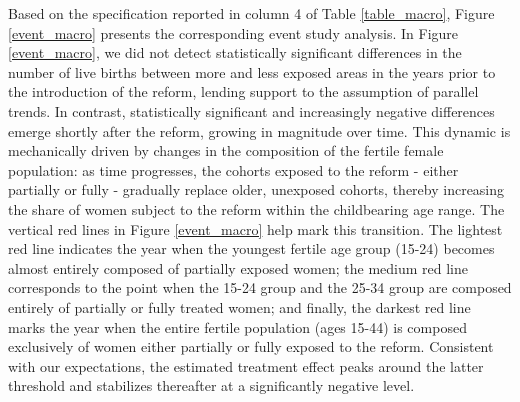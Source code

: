 \documentclass[a4paper,oneside,final,onecolumn,12pt,english]{article}
\begin{document}
\begin{table}[htp!]
\caption{The impact of Francoist primary school reform on the number of births: DiD}
\label{table_macro}
	\center
\end{table}


Based on the specification reported in column 4 of Table \ref{table_macro}, Figure \ref{event_macro} presents the corresponding event study analysis. In Figure \ref{event_macro}, we did not detect statistically significant differences in the number of live births between more and less exposed areas in the years prior to the introduction of the reform, lending support to the assumption of parallel trends. In contrast, statistically significant and increasingly negative differences emerge shortly after the reform, growing in magnitude over time. This dynamic is mechanically driven by changes in the composition of the fertile female population: as time progresses, the cohorts exposed to the reform - either partially or fully - gradually replace older, unexposed cohorts, thereby increasing the share of women subject to the reform within the childbearing age range. The vertical red lines in Figure \ref{event_macro} help mark this transition. The lightest red line indicates the year when the youngest fertile age group (15-24) becomes almost entirely composed of partially exposed women; the medium red line corresponds to the point when the 15-24 group and the 25-34 group are composed entirely of partially or fully treated women; and finally, the darkest red line marks the year when the entire fertile population (ages 15-44) is composed exclusively of women either partially or fully exposed to the reform. Consistent with our expectations, the estimated treatment effect peaks around the latter threshold and stabilizes thereafter at a significantly negative level.
\end{document}
